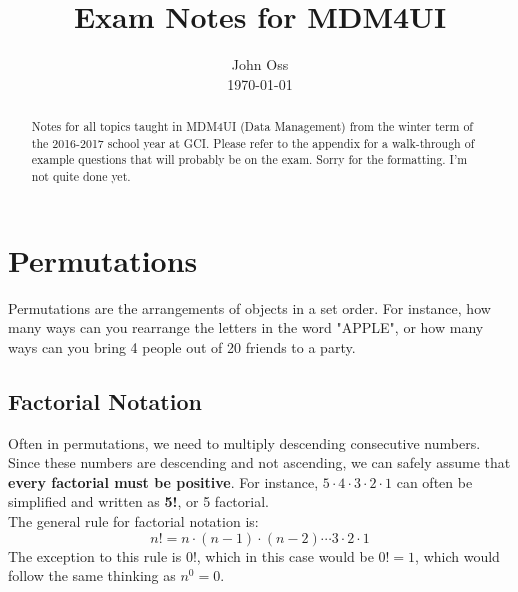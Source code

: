 \documentclass[final,1p,12pt]{elsarticle}
\begin{document}
\begin{frontmatter}
    \title{Exam Notes for MDM4UI}
    \author{John Oss\\
            \today}
    \begin{abstract}
        Notes for all topics taught in MDM4UI (Data Management) from the winter term of the 2016-2017 school year at GCI.  
        Please refer to the appendix for a walk-through of example questions that will probably be on the exam. 
        Sorry for the formatting. I'm not quite done yet.
    \end{abstract}
\end{frontmatter}

\section{Permutations}
Permutations are the arrangements of objects in a set order. 
For instance, how many ways can you rearrange the letters in the word "APPLE", 
or how many ways can you bring 4 people out of 20 friends to a party.

    \subsection{Factorial Notation}
    Often in permutations, we need to multiply descending consecutive numbers.
    Since these numbers are descending and not ascending, we can safely assume that \textbf{every factorial must be positive}. 
    For instance,  $5\cdot4\cdot3\cdot2\cdot1$ can often be simplified and written as \textbf{5!}, or 5 factorial.\\
    The general rule for factorial notation is: 
    \begin{equation*}%
        n! = n\cdot(n-1)\cdot(n-2)\cdots3\cdot2\cdot1
    \end{equation*}
    The exception to this rule is 0!, which in this case would be $0! = 1$, which would follow the same thinking as $n^0=0$.
    
\end{document}
